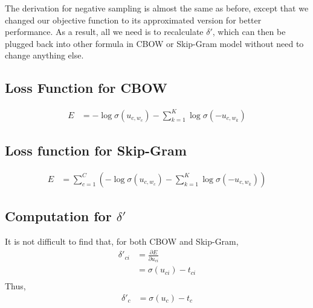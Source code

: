 \documentclass{article}
\begin{document}
The derivation for negative sampling is almost the same as before, except that we changed our objective function to its  approximated version for better performance. As a result, all we need is to recalculate $\delta'$, which can then be plugged back into other formula in CBOW or Skip-Gram model without need to change anything else. 
	\subsection {Loss Function for CBOW} 
	\begin{equation}
		\begin{aligned}
			E &= -\log \sigma(u_{c,w_c}) - \sum_{k=1}^{K} \log \sigma (-u_{c,w_k}) 
		\end{aligned}
	\end{equation}

	\subsection {Loss function for Skip-Gram} 
	\begin{equation}
		\begin{aligned}
		E &= \sum_{c=1}^{C} \left( -\log \sigma(u_{c,w_c}) - \sum_{k=1}^{K} \log \sigma (-u_{c,w_k})  \right)
		\end{aligned}
	\end{equation}
	
	\subsection{Computation for $\delta'$}
	It is not difficult to find that, for both CBOW and Skip-Gram,
	\begin{equation}
		\begin{aligned}
		\delta'_{ci} &= \frac{\partial E}{\partial u_{ci}} \\
		&= \sigma(u_{ci}) - t_{ci} \\
		\end{aligned}
	\end{equation}
	Thus,
	\begin{equation}
		\begin{aligned}
		\delta'_{c} &= \sigma(u_{c}) - t_{c} \\
		\end{aligned}
	\end{equation}
\end{document}
